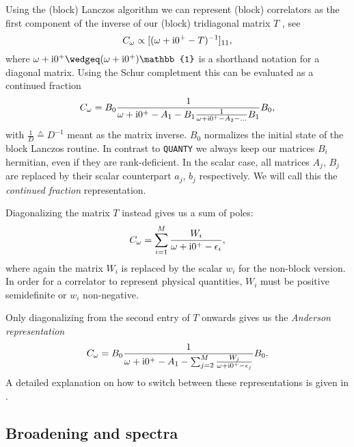 Using the (block) Lanczos algorithm we can represent (block) correlators as the first component
of the inverse of our (block) tridiagonal matrix $T$ \cite{Lu2014},
see 
\begin{equation}
    C_\omega
    \propto
    [(\omega + \mathrm{i}0^+ - T)^{-1}]_{11},
\end{equation}
where $\omega + \mi0^+ \wedgeq (\omega + \mi0^+)\mathbb{1}$ is a shorthand notation
for a diagonal matrix.
Using the Schur completment \cite{Schur1917} this can be evaluated as a continued fraction
\begin{equation}
    C_\omega
    =
    B_0\frac{1}{\omega + \mathrm{i}0^+ - A_1 - B_1\frac{1}{\omega + \mathrm{i}0^+ - A_2 - \ldots}B_1}B_0,
\end{equation}
with $\frac{1}{D} \wedgeq D^{-1}$ meant as the matrix inverse.
$B_0$ normalizes the initial state of
the block Lanczos routine.
In contrast to \texttt{QUANTY} \cite{Ackermann2024} we always keep our matrices $B_i$ hermitian,
even if they are rank-deficient.
In the scalar case, all matrices $A_j$, $B_j$ are replaced by
their scalar counterpart $a_j$, $b_j$ respectively.
We will call this the \emph{continued fraction} representation.

Diagonalizing the matrix $T$ instead gives us a sum of poles:
\begin{equation}
    C_\omega
    =
    \sum_{i=1}^M \frac{W_i}{\omega + \mathrm{i}0^+ - \epsilon_i},
    \label{eq:correlator-sum}
\end{equation}
where again the matrix $W_i$ is replaced by the scalar $w_i$ for the non-block version.
In order for a correlator to represent physical quantities,
$W_i$ must be positive semidefinite or
$w_i$ non-negative.

Only diagonalizing from the second entry of $T$ onwards gives us the \emph{Anderson representation}
\begin{equation}
    C_\omega
    =
    B_0\frac{1}{\omega + \mathrm{i}0^+ - A_1 - \sum_{j=2}^M \frac{W_j}{\omega + \mathrm{i}0^+ - \epsilon_j}}B_0.
    \label{eq:correlator-anderson}
\end{equation}
A detailed explanation on how to switch between these representations is given in \cite{Lu2014}.

\subsection{Broadening and spectra}

